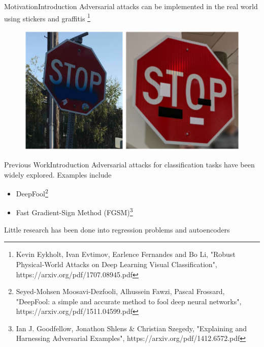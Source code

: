 \documentclass[xcolor={cmyk}]{beamer}
\begin{document}
\begin{frame}{Motivation}{Introduction}
	Adversarial attacks can be implemented in the real world using stickers and graffitis \footnote{Kevin Eykholt, Ivan Evtimov, Earlence Fernandes and Bo Li, "Robust Physical-World Attacks on Deep Learning Visual Classification", https://arxiv.org/pdf/1707.08945.pdf}
	\begin{figure}
	\centering
	\includegraphics[scale=0.3]{street-adversarial}
	\end{figure}
\end{frame}


\begin{frame}{Previous Work}{Introduction}
	Adversarial attacks for classification tasks have been widely explored. Examples include

	\begin{itemize}
		\item DeepFool\footnote{Seyed-Mohsen Moosavi-Dezfooli, Alhussein Fawzi, Pascal Frossard, "DeepFool: a simple and accurate method to fool deep neural networks", https://arxiv.org/pdf/1511.04599.pdf}
		\item Fast Gradient-Sign Method (FGSM)\footnote{Ian J. Goodfellow, Jonathon Shlens \& Christian Szegedy, "Explaining and Harnessing Adversarial Examples", https://arxiv.org/pdf/1412.6572.pdf}
	\end{itemize}

	Little research has been done into regression problems and autoencoders
\end{frame}
\end{document}
